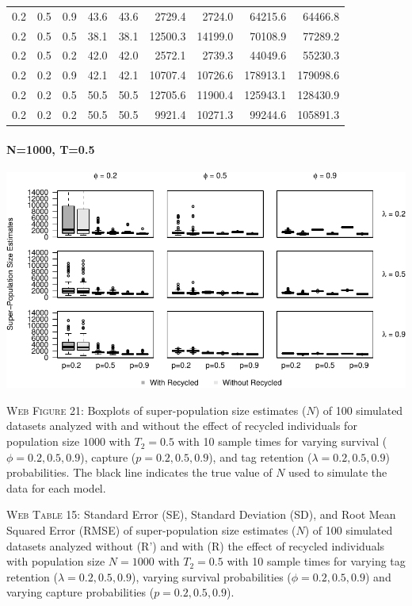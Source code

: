 \documentclass[]{article}
\let\oldparagraph\paragraph
\renewcommand{\paragraph}[1]{\oldparagraph{#1}\mbox{}}
\begin{document}
\begin{table}[ht]
{\begin{tabular}{rrrrrrrrr}
  0.2 & 0.5 & 0.9 & 43.6 & 43.6 & 2729.4 & 2724.0 & 64215.6 & 64466.8 \\ 
  0.2 & 0.5 & 0.5 & 38.1 & 38.1 & 12500.3 & 14199.0 & 70108.9 & 77289.2 \\ 
  0.2 & 0.5 & 0.2 & 42.0 & 42.0 & 2572.1 & 2739.3 & 44049.6 & 55230.3 \\ 
  0.2 & 0.2 & 0.9 & 42.1 & 42.1 & 10707.4 & 10726.6 & 178913.1 & 179098.6 \\ 
  0.2 & 0.2 & 0.5 & 50.5 & 50.5 & 12705.6 & 11900.4 & 125943.1 & 128430.9 \\ 
  0.2 & 0.2 & 0.2 & 50.5 & 50.5 & 9921.4 & 10271.3 & 99244.6 & 105891.3 \\ 
   \hline
\end{tabular}
}
\endgroup
\end{table}

\newpage

\paragraph{N=1000, T=0.5}\label{n1000-t0.5-3}

\includegraphics{Appendix_BW_files/figure-latex/figure21_superN_GJSTL4-1.pdf}

\textsc{Web Figure 21:} Boxplots of super-population size estimates
(\(N\)) of 100 simulated datasets analyzed with and without the effect
of recycled individuals for population size \(1000\) with \(T_2=0.5\)
with 10 sample times for varying survival (\(\phi=0.2,0.5,0.9\)),
capture (\(p=0.2,0.5,0.9\)), and tag retention (\(\lambda=0.2,0.5,0.9\))
probabilities. The black line indicates the true value of \(N\) used to
simulate the data for each model.

\textsc{Web Table 15:} Standard Error (SE), Standard Deviation (SD), and
Root Mean Squared Error (RMSE) of super-population size estimates
(\(N\)) of 100 simulated datasets analyzed without (R') and with (R) the
effect of recycled individuals with population size \(N=1000\) with
\(T_2=0.5\) with 10 sample times for varying tag retention
(\(\lambda=0.2,0.5,0.9\)), varying survival probabilities
(\(\phi=0.2,0.5,0.9\)) and varying capture probabilities
(\(p=0.2,0.5,0.9\)).
\end{document}

